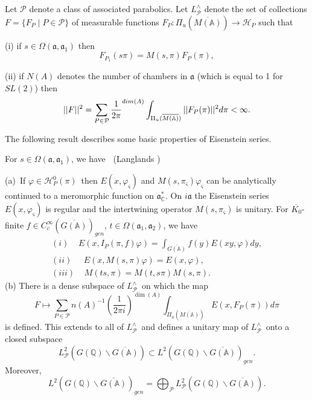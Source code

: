 Let ${\mathcal P}$ denote a class of associated parabolics. Let
$L_{{\mathcal P}}^{\wedge }$ denote the
set of collections $F=\{F_P\;|\;P\in {\mathcal P}\}$ of
measurable functions
$F_P:\Pi _u(\overline{M({\mathbb{A}})})\rightarrow {\mathcal H}_P$ such
that

(i) if $s\in \Omega ({\mathfrak{a}},{\mathfrak{a}}_1)$ then 
\[
F_{P_1}(s\pi )=M(s,\pi )F_P(\pi ),
\]

(ii) if $N(A)$ denotes the number of chambers in ${\mathfrak{a}}$
(which is equal to 1 for $SL(2)$) then 
\[
||F||^2=\sum_{P\in {\mathcal{P}}}{1\over 2\pi }^{dim(A)}
\int_{\Pi _u(\overline{M({\mathbb{A}})})}
||F_P(\pi )||^2d\pi <\infty .
\]

The following result describes some basic properties of Eisenstein series.

\begin{theorem}\label{thm:5.8} For
$s\in \Omega ({\mathfrak{a}},{\mathfrak{a}}_1)$, we have
{\bf \ }(Langlands \cite[p. 927]{A2})

(a)\ If $\varphi \in {\mathcal H}_P^0(\pi )$\ then
$E(x,\varphi _\varsigma )$ and
$M(s,\pi _\varsigma )\varphi _\varsigma $
can be analytically continued
to a meromorphic function on ${\mathfrak{a}}_{{\mathbb C}}^{*}$. On 
$i{\mathfrak{a}}$ the
Eisenstein series $E(x,\varphi_\varsigma )$
is regular and the intertwining operator $M(s,\pi_\varsigma )$
is unitary. For $\overline{K_0}$-finite
$f\in C_c^\infty (\overline{G({\mathbb{A}})})_{gen}$,
$t\in \Omega ({\mathfrak{a}}_1,{\mathfrak{a}}_2)$, we have 
\[
\begin{array}{c}
(i)\;\;\;\;E(x,I_P(\pi ,f)\varphi )
=\int_{\overline{G({\mathbb{A}})}}f(y)E(xy,\varphi )dy,
\\ 
(ii)\;\;\;\;\;E(x,M(s,\pi )\varphi )=E(x,\varphi ), \\ 
(iii)\;\;\;\;M(ts,\pi )=M(t,s\pi )M(s,\pi ).
\end{array}
\]
(b) There is a dense subspace of $L_{{\mathcal P}}^{\wedge }$\ on which the map 
\[
F\longmapsto \sum_{P\in {\mathcal P}}n(A)^{-1}
\left( \frac 1{2\pi i}\right)^{\dim (A)}
\int_{\Pi _u(\overline{M({\mathbb{A}})})}E(x,F_P(\pi ))d\pi 
\]
is defined. This extends to all of $L_{{\mathcal P}}^{\wedge }$\ and defines a
unitary map of $L_{{\mathcal P}}^{\wedge }$\ onto a closed subspace 
\[
L_{{\mathcal P}}^2(G({{\mathbb{Q}}})\backslash \overline{G({\mathbb{A}})})
\subset L^2(G({\mathbb{Q}})\backslash \overline{G({\mathbb{A}})})_{gen}.
\]
Moreover, 
\[
L^2(G({\mathbb{Q}})\backslash \overline{G({\mathbb{A}})})_{gen}
=\bigoplus_{\mathcal{P}}
L_{\mathcal{P}}^2(G({\mathbb{Q}})\backslash \overline{G({\mathbb{A}})}).
\]
\end{theorem}

